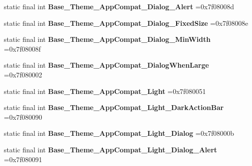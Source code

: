 \begin{DoxyCompactItemize}
\item 
\hypertarget{classcheck_1_1test_1_1_r_1_1style_a9522d2cdae5fbd28b7f4eb2fd029651f}{}static final int {\bfseries Base\+\_\+\+Theme\+\_\+\+App\+Compat\+\_\+\+Dialog\+\_\+\+Alert} =0x7f08008d\label{classcheck_1_1test_1_1_r_1_1style_a9522d2cdae5fbd28b7f4eb2fd029651f}

\item 
\hypertarget{classcheck_1_1test_1_1_r_1_1style_ae47d2b0638f74042b487347b9aba8e11}{}static final int {\bfseries Base\+\_\+\+Theme\+\_\+\+App\+Compat\+\_\+\+Dialog\+\_\+\+Fixed\+Size} =0x7f08008e\label{classcheck_1_1test_1_1_r_1_1style_ae47d2b0638f74042b487347b9aba8e11}

\item 
\hypertarget{classcheck_1_1test_1_1_r_1_1style_a4a754f5e0f533357864705d27c45ee77}{}static final int {\bfseries Base\+\_\+\+Theme\+\_\+\+App\+Compat\+\_\+\+Dialog\+\_\+\+Min\+Width} =0x7f08008f\label{classcheck_1_1test_1_1_r_1_1style_a4a754f5e0f533357864705d27c45ee77}

\item 
\hypertarget{classcheck_1_1test_1_1_r_1_1style_aa0180424122219c548f1defe2f4a76c3}{}static final int {\bfseries Base\+\_\+\+Theme\+\_\+\+App\+Compat\+\_\+\+Dialog\+When\+Large} =0x7f080002\label{classcheck_1_1test_1_1_r_1_1style_aa0180424122219c548f1defe2f4a76c3}

\item 
\hypertarget{classcheck_1_1test_1_1_r_1_1style_a080d8d4832d5f971b39f87fa938e9c65}{}static final int {\bfseries Base\+\_\+\+Theme\+\_\+\+App\+Compat\+\_\+\+Light} =0x7f080051\label{classcheck_1_1test_1_1_r_1_1style_a080d8d4832d5f971b39f87fa938e9c65}

\item 
\hypertarget{classcheck_1_1test_1_1_r_1_1style_a552997b2d2c90f3ce3335e6588d574ff}{}static final int {\bfseries Base\+\_\+\+Theme\+\_\+\+App\+Compat\+\_\+\+Light\+\_\+\+Dark\+Action\+Bar} =0x7f080090\label{classcheck_1_1test_1_1_r_1_1style_a552997b2d2c90f3ce3335e6588d574ff}

\item 
\hypertarget{classcheck_1_1test_1_1_r_1_1style_ac8f2e1fc9d9ff379a71013511b47b762}{}static final int {\bfseries Base\+\_\+\+Theme\+\_\+\+App\+Compat\+\_\+\+Light\+\_\+\+Dialog} =0x7f08000b\label{classcheck_1_1test_1_1_r_1_1style_ac8f2e1fc9d9ff379a71013511b47b762}

\item 
\hypertarget{classcheck_1_1test_1_1_r_1_1style_a6d2a8397651f9bf79c7262569041a8f3}{}static final int {\bfseries Base\+\_\+\+Theme\+\_\+\+App\+Compat\+\_\+\+Light\+\_\+\+Dialog\+\_\+\+Alert} =0x7f080091\label{classcheck_1_1test_1_1_r_1_1style_a6d2a8397651f9bf79c7262569041a8f3}


\end{DoxyCompactItemize}
